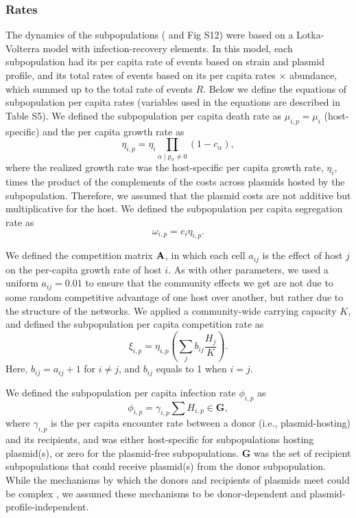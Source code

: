 \documentclass[10pt,letterpaper]{article}
\begin{document}
\subsubsection*{Rates} The dynamics of the subpopulations ( and Fig S12) were based on a Lotka-Volterra model with infection-recovery elements. In this model, each subpopulation had its per capita rate of events based on strain and plasmid profile, and its total rates of events based on its per capita rates $\times$ abundance, which summed up to the total rate of events $R$. Below we define the equations of subpopulation per capita rates (variables used in the equations are described in Table S5).
We defined the subpopulation per capita death rate as $\mu_{i,p} = \mu_{i}$ (host-specific) and the per capita growth rate as
\begin{equation}
    \eta_{i,p} = \eta_i\prod_{\alpha \mid p_{\alpha} \neq 0} (1-c_{\alpha}), \label{eq2}
\end{equation}
where the realized growth rate was the host-specific per capita growth rate, $\eta_i$, times the product of the complements of the costs across plasmids hosted by the subpopulation. Therefore, we assumed that the plasmid costs are not additive but multiplicative for the host. We defined the subpopulation per capita segregation rate as
\begin{equation}
    \omega_{i,p} = e_i\eta_{i,p}.  \label{eq3}
\end{equation}

We defined the competition matrix $\vb{A}$, in which each cell $a_{ij}$ is the effect of host $j$ on the per-capita growth rate of host $i$. As with other parameters, we used a uniform $a_{ij}=0.01$ to ensure that the community effects we get are not due to some random competitive advantage of one host over another, but rather due to the structure of the networks. We applied a community-wide carrying capacity $K$, and defined the subpopulation per capita competition rate as
\begin{equation}
    \xi_{i,p} = \eta_{i,p} \left( \sum\limits_j b_{ij}\frac{H_j}{K}\right).\label{eq4}
\end{equation}
Here, $b_{ij} = a_{ij}+1$ for $i \neq j$, and $b_{ij}$ equals to 1 when $i=j$. 

We defined the subpopulation per capita infection rate $\phi_{i,p}$ as
\begin{equation}
\phi_{i,p} = \gamma_{i,p}\sum{H_{i,p} \in \mathbf{G}},  \label{eq5}
\end{equation}
where $\gamma_{i,p}$ is the per capita encounter rate between a donor (i.e., plasmid-hosting) and its recipients, and was either host-specific for subpopulations hosting plasmid(s), or zero for the plasmid-free subpopulations. $\mathbf{G}$ was the set of recipient subpopulations that could receive plasmid(s) from the donor subpopulation. While the mechanisms by which the donors and recipients of plasmids meet could be complex \cite{Neil2021-rp}, we assumed these mechanisms to be donor-dependent and plasmid-profile-independent.
\end{document}
